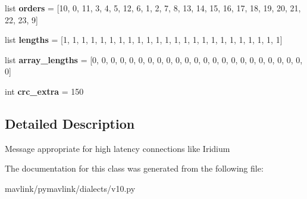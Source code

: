 \begin{DoxyCompactItemize}
list {\bfseries orders} = \mbox{[}10, 0, 11, 3, 4, 5, 12, 6, 1, 2, 7, 8, 13, 14, 15, 16, 17, 18, 19, 20, 21, 22, 23, 9\mbox{]}
\item 
\mbox{\label{classpymavlink_1_1dialects_1_1v10_1_1MAVLink__high__latency__message_afbb34ddddb13e9ec0007b87086737704}} 
list {\bfseries lengths} = \mbox{[}1, 1, 1, 1, 1, 1, 1, 1, 1, 1, 1, 1, 1, 1, 1, 1, 1, 1, 1, 1, 1, 1, 1, 1\mbox{]}
\item 
\mbox{\label{classpymavlink_1_1dialects_1_1v10_1_1MAVLink__high__latency__message_a15668bec99d0d92a7fd5954b5e9778db}} 
list {\bfseries array\+\_\+lengths} = \mbox{[}0, 0, 0, 0, 0, 0, 0, 0, 0, 0, 0, 0, 0, 0, 0, 0, 0, 0, 0, 0, 0, 0, 0, 0\mbox{]}
\item 
\mbox{\label{classpymavlink_1_1dialects_1_1v10_1_1MAVLink__high__latency__message_a9b281bbfaffeb2994d2b9ca753317f08}} 
int {\bfseries crc\+\_\+extra} = 150
\end{DoxyCompactItemize}


\subsection{Detailed Description}
\begin{DoxyVerb}Message appropriate for high latency connections like Iridium
\end{DoxyVerb}
 

The documentation for this class was generated from the following file\+:\begin{DoxyCompactItemize}
\item 
mavlink/pymavlink/dialects/v10.\+py\end{DoxyCompactItemize}

